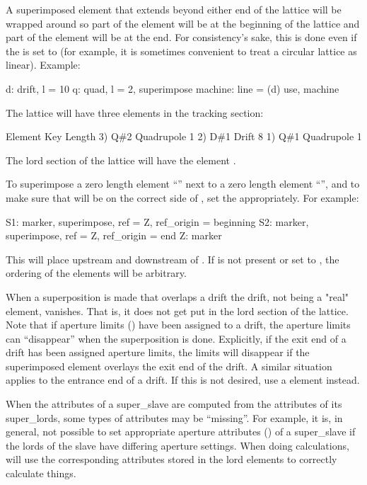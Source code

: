 A superimposed element that extends beyond either end of the lattice
will be wrapped around so part of the element will be at the beginning
of the lattice and part of the element will be at the end. For
consistency's sake, this is done even if the  is set to
 (for example, it is sometimes convenient to treat a circular
lattice as linear). Example:
\begin{example}
  d: drift, l = 10
  q: quad, l = 2, superimpose
  machine: line = (d)
  use, machine
\end{example}
The lattice will have three elements in the tracking section:
\begin{example}
        Element   Key           Length
  3)    Q{\#}2       Quadrupole    1
  2)    D{\#}1       Drift         8
  1)    Q{\#}1       Quadrupole    1
\end{example}
The lord section of the lattice will have the element . 

To superimpose a zero length element ``'' next to a zero length
element ``'', and to make sure that  will be on the
correct side of , set the  appropriately.
For example:
\begin{example}
  S1: marker, superimpose, ref = Z, ref_origin = beginning
  S2: marker, superimpose, ref = Z, ref_origin = end
  Z: marker
\end{example}
This will place  upstream and  downstream of .  If
 is not present or set to , the ordering of the
elements will be arbitrary.

When a superposition is made that overlaps a drift the drift, not
being a "real" element, vanishes. That is, it does not get put in the
lord section of the lattice.  Note that if aperture limits
() have been assigned to a drift, the aperture limits
can ``disappear'' when the superposition is done. Explicitly, if the
exit end of a drift has been assigned aperture limits, the limits will
disappear if the superimposed element overlays the exit end of the
drift. A similar situation applies to the entrance end of a drift. If
this is not desired, use a  element instead.

When the attributes of a super_slave are computed from the attributes
of its super_lords, some types of attributes may be ``missing''. For
example, it is, in general, not possible to set appropriate aperture
attributes () of a super_slave if the lords of the slave
have differing aperture settings. When doing calculations, \bmad will
use the corresponding attributes stored in the lord elements to
correctly calculate things.

